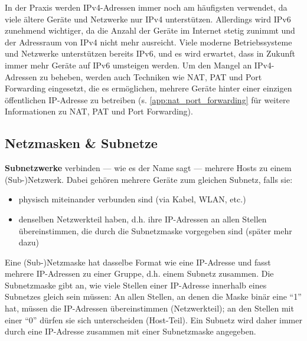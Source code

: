 \begin{myremark}
	In der Praxis werden \gls{IP}v4-Adressen immer noch am häufigsten verwendet, da viele ältere Geräte und Netzwerke nur \gls{IP}v4 unterstützen. Allerdings wird \gls{IP}v6 zunehmend wichtiger, da die Anzahl der Geräte im Internet stetig zunimmt und der Adressraum von \gls{IP}v4 nicht mehr ausreicht. Viele moderne Betriebssysteme und Netzwerke unterstützen bereits \gls{IP}v6, und es wird erwartet, dass in Zukunft immer mehr Geräte auf \gls{IP}v6 umsteigen werden. Um den Mangel an \gls{IP}v4-Adressen zu beheben, werden auch Techniken wie \acrfull{NAT}, \acrfull{PAT} und Port Forwarding eingesetzt, die es ermöglichen, mehrere Geräte hinter einer einzigen öffentlichen \gls{IP}-Adresse zu betreiben (s. \cref{app:nat_port_forwarding} für weitere Informationen zu \acrshort{NAT}, \acrshort{PAT} und Port Forwarding).
\end{myremark}

\subsection{Netzmasken \& Subnetze}
\textbf{Subnetzwerke} verbinden --- wie es der Name sagt --- mehrere Hosts zu einem (Sub-)Netzwerk. Dabei gehören mehrere Geräte zum gleichen Subnetz, falls sie:
\begin{itemize}
	\item physisch miteinander verbunden sind (via Kabel, \gls{WLAN}, etc.)
	\item denselben Netzwerkteil haben, d.h. ihre \gls{IP}-Adressen an allen Stellen übereinstimmen, die durch die Subnetzmaske vorgegeben sind (später mehr dazu)
\end{itemize}

Eine (Sub-)Netzmaske hat dasselbe Format wie eine \gls{IP}-Adresse und fasst mehrere \gls{IP}-Adressen zu einer Gruppe, d.h. einem Subnetz zusammen. Die Subnetzmaske gibt an, wie viele Stellen einer \gls{IP}-Adresse innerhalb eines Subnetzes gleich sein müssen: An allen Stellen, an denen die Maske binär eine \enquote{1} hat, müssen die \gls{IP}-Adressen übereinstimmen (Netzwerkteil); an den Stellen mit einer \enquote{0} dürfen sie sich unterscheiden (Host-Teil). Ein Subnetz wird daher immer durch eine \gls{IP}-Adresse zusammen mit einer Subnetzmaske angegeben.

